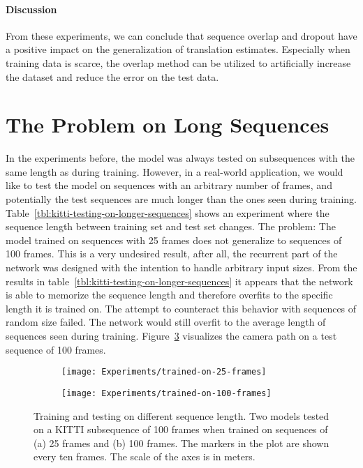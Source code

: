 		\paragraph{Discussion}
		From these experiments, we can conclude that sequence overlap and dropout have a positive impact on the generalization of translation estimates.
		Especially when training data is scarce, the overlap method can be utilized to artificially increase the dataset and reduce the error on the test data.
		
	\section{The Problem on Long Sequences}
		In the experiments before, the model was always tested on subsequences with the same length as during training.
		However, in a real-world application, we would like to test the model on sequences with an arbitrary number of frames, and potentially the test sequences are much longer than the ones seen during training.
		Table~\ref{tbl:kitti-testing-on-longer-sequences} shows an experiment where the sequence length between training set and test set changes.
		The problem: The model trained on sequences with 25 frames does not generalize to sequences of 100 frames.
		This is a very undesired result, after all, the recurrent part of the network was designed with the intention to handle arbitrary input sizes.
		From the results in table~\ref{tbl:kitti-testing-on-longer-sequences} it appears that the network is able to memorize the sequence length and therefore overfits to the specific length it is trained on.
		The attempt to counteract this behavior with sequences of random size failed.
		The network would still overfit to the average length of sequences seen during training.
		Figure~\ref{fig:kitti-testing-on-longer-sequences} visualizes the camera path on a test sequence of 100 frames.
		\begin{figure}
			\centering
			\begin{subfigure}[b]{0.5\linewidth}
				\centering
				\texttt{[image: Experiments/trained-on-25-frames]}
				\caption{
					\label{fig:0}
				}
			\end{subfigure}%
			\begin{subfigure}[b]{0.5\linewidth}
				\centering
				\texttt{[image: Experiments/trained-on-100-frames]}
				\caption{
					\label{fig:1}
				}
			\end{subfigure}%
			\caption[Training and testing on different sequence length]
					{Training and testing on different sequence length. 
					 Two models tested on a KITTI subsequence of 100 frames when trained on sequences of (a) 25 frames and (b) 100 frames. 
					 The markers in the plot are shown every ten frames.
					 The scale of the axes is in meters.
					 \label{fig:kitti-testing-on-longer-sequences}}
		\end{figure}
